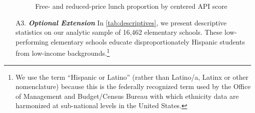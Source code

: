 \documentclass[a4paper, 11pt]{article}
\begin{document}
\begin{enumerate}
\begin{figure} 
\begin{center}
\caption{Free- and reduced-price lunch proportion by centered API score}
\label{fig:manip}
\end{center}
\end{figure}

	\item[A3.] \textbf{\textit{Optional Extension}} In \autoref{tab:descriptives}, we present descriptive statistics on our analytic sample of 16,462 elementary schools. These low-performing elementary schools educate disproportionately Hispanic students from low-income backgrounds.\footnote{We use the term ``Hispanic or Latino'' (rather than Latino/a, Latinx or other nomenclature) because this is the federally recognized term used by the Office of Management and Budget/Census Bureau with which ethnicity data are harmonized at sub-national levels in the United States.} 


\end{enumerate}
\end{document}
